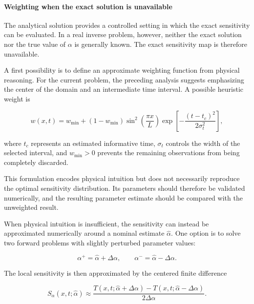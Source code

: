 \paragraph{Weighting when the exact solution is unavailable}

The analytical solution provides a controlled setting in which the exact
sensitivity can be evaluated. In a real inverse problem, however, neither the
exact solution nor the true value of $\alpha$ is generally known. The exact
sensitivity map is therefore unavailable.

A first possibility is to define an approximate weighting function from physical
reasoning. For the current problem, the preceding analysis suggests emphasizing
the center of the domain and an intermediate time interval. A possible heuristic
weight is

\begin{equation}
w(x,t)
=
w_{\min}
+
\left(1-w_{\min}\right)
\sin^2\left(\frac{\pi x}{L}\right)
\exp\left[
-\frac{(t-t_c)^2}{2\sigma_t^2}
\right],
\end{equation}

where $t_c$ represents an estimated informative time, $\sigma_t$ controls the
width of the selected interval, and $w_{\min}>0$ prevents the remaining
observations from being completely discarded.

This formulation encodes physical intuition but does not necessarily reproduce
the optimal sensitivity distribution. Its parameters should therefore be
validated numerically, and the resulting parameter estimate should be compared
with the unweighted result.

When physical intuition is insufficient, the sensitivity can instead be
approximated numerically around a nominal estimate $\widehat{\alpha}$. One option
is to solve two forward problems with slightly perturbed parameter values:

\begin{equation}
\alpha^{+}
=
\widehat{\alpha}+\Delta\alpha,
\qquad
\alpha^{-}
=
\widehat{\alpha}-\Delta\alpha.
\end{equation}

The local sensitivity is then approximated by the centered finite difference

\begin{equation}
S_{\alpha}(x,t;\widehat{\alpha})
\approx
\frac{
T(x,t;\widehat{\alpha}+\Delta\alpha)
-
T(x,t;\widehat{\alpha}-\Delta\alpha)
}{
2\Delta\alpha
}.
\end{equation}

